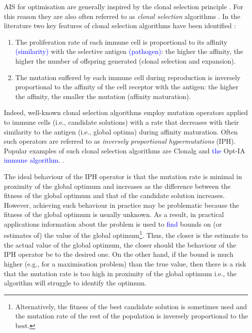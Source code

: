 \documentclass[lettersize,journal]{IEEEtran}
\newcommand{\new}[1]{\textcolor{blue}{#1}}
\begin{document}
AIS for optimisation \cite{DeCastroTimmisBook,MO2020AAAI} are generally inspired by the clonal selection principle  \cite{Burnet1959}.
For this reason they are also often referred  to as {\it clonal selection} algorithms \cite{DeCastroTimmisBook}. 
In the literature two key features of clonal selection algorithms have been identified \cite{Brownlee2007}: 
\begin{enumerate}
	\item  The proliferation rate of each immune cell is proportional to its affinity \new{(similarity)} with the selective antigen \new{(pathogen)}: the higher the affinity, 
	the higher the number of offspring generated (clonal selection and expansion). %
	\item The mutation suffered by each immune cell during reproduction is inversely proportional to the affinity of the cell receptor with the antigen: the higher the affinity, 
	the smaller the mutation (affinity maturation).
\end{enumerate}
Indeed, well-known clonal selection algorithms employ mutation operators applied to immune cells (i.e., candidate solutions) with a rate that decreases with their similarity to the 
antigen (i.e., global optima) during affinity maturation. Often such operators are referred to as {\it inversely proportional hypermutations} (IPH). 
Popular examples of such clonal selection algorithms are Clonalg \cite{DecastroVonzuben2002}   and \new{the} Opt-IA \new{immune algorithm.} \cite{CutelloNicosiaPavoneTimmis2007}. %

%
The ideal behaviour of the IPH operator is that the mutation rate is minimal in proximity of the global optimum and increases as the difference between the fitness of the global optimum
and that of the candidate solution increases. However, achieving such behaviour in practice may be problematic because the fitness of the global optimum is usually unknown.
As a result, in practical applications information about the problem is used to \new{find} bounds on (or estimates of)  the value of the global optimum\footnote{Alternatively, the fitness of the best candidate solution is sometimes used and 
	the mutation rate of the rest of the population is inversely proportional to the best.}.
Thus, the closer is the estimate to the actual value of the global optimum, the closer should the behaviour of the IPH operator be to the desired one.
On the other hand,  if the bound is much higher (e.g., for a maximisation problem)  than the true value, then there is a risk that the mutation rate is too high in proximity of the global optimum 
i.e., the algorithm will struggle to identify the optimum. 
\end{document}
